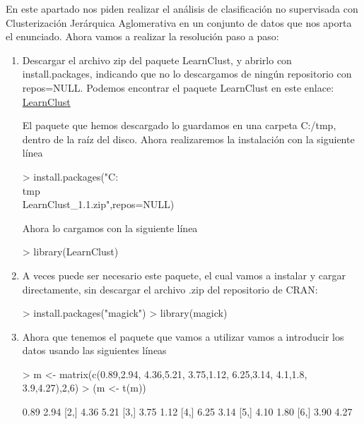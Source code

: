 \documentclass[parskip=full]{scrartcl}
\begin{document}
En este apartado nos piden realizar el análisis de clasificación no supervisada con Clusterización Jerárquica Aglomerativa en un conjunto de datos que nos aporta el enunciado. Ahora vamos a realizar la resolución paso a paso:

\begin{enumerate}
    \item Descargar el archivo zip del paquete LearnClust, y abrirlo con install.packages, indicando que no lo descargamos de ningún repositorio con repos=NULL. Podemos encontrar el paquete LearnClust en este enlace: \href{https://cran.rediris.es/web/packages/LearnClust/index.html}{LearnClust}
    
    El paquete que hemos descargado lo guardamos en una carpeta C:/tmp, dentro de la raíz del disco. Ahora realizaremos la instalación con la siguiente línea


\begin{Schunk}
\begin{Sinput}
> install.packages("C:\\tmp\\LearnClust_1.1.zip",repos=NULL)
\end{Sinput}
\end{Schunk}
  

    Ahora lo cargamos con la siguiente línea


\begin{Schunk}
\begin{Sinput}
> library(LearnClust)
\end{Sinput}
\end{Schunk}


\item A veces puede ser necesario este paquete, el cual vamos a instalar y cargar directamente, sin descargar el archivo .zip del repositorio de CRAN:

\begin{Schunk}
\begin{Sinput}
> install.packages("magick")
> library(magick)
\end{Sinput}
\end{Schunk}


    \item Ahora que tenemos el paquete que vamos a utilizar vamos a introducir los datos usando las siguientes líneas


\begin{Schunk}
\begin{Sinput}
> m <- matrix(c(0.89,2.94, 4.36,5.21, 3.75,1.12, 6.25,3.14, 4.1,1.8, 3.9,4.27),2,6)
> (m <- t(m))
\end{Sinput}
\begin{Soutput}
     [,1] [,2]
[1,] 0.89 2.94
[2,] 4.36 5.21
[3,] 3.75 1.12
[4,] 6.25 3.14
[5,] 4.10 1.80
[6,] 3.90 4.27
\end{Soutput}
\end{Schunk}



\end{enumerate}
\end{document}
